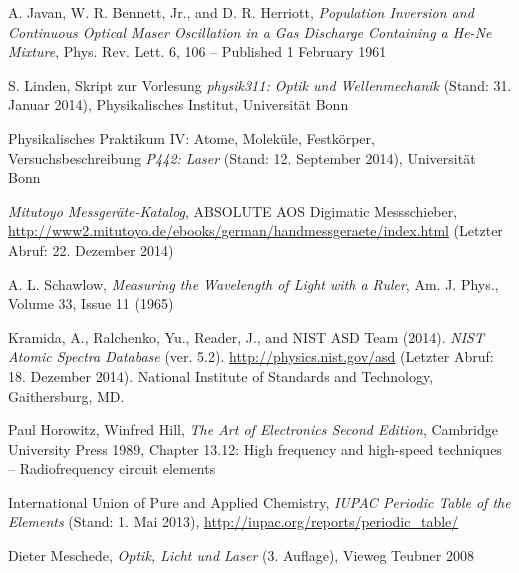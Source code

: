 \documentclass[11pt, a4paper]{article}
\numberwithin{equation}{section}
\begin{document}
\begin{thebibliography}{9}
	A. Javan, W. R. Bennett, Jr., and D. R. Herriott,
	\emph{Population Inversion and Continuous Optical Maser Oscillation in a Gas Discharge Containing a He-Ne Mixture},
	Phys. Rev. Lett. 6, 106 – Published 1 February 1961

	S. Linden,
	Skript zur Vorlesung \emph{physik311: Optik und Wellenmechanik} (Stand: 31. Januar 2014),
	Physikalisches Institut, Universität Bonn

	Physikalisches Praktikum IV: Atome, Moleküle, Festkörper,
	Versuchsbeschreibung \emph{P442: Laser} (Stand: 12. September 2014),
	Universität Bonn
	
	\emph{Mitutoyo Messgeräte-Katalog},
	ABSOLUTE AOS Digimatic Messschieber,\\
	\url{http://www2.mitutoyo.de/ebooks/german/handmessgeraete/index.html} (Letzter Abruf: 22. Dezember 2014)	

	A. L. Schawlow,
	\emph{Measuring the Wavelength of Light with a Ruler},
	Am. J. Phys., Volume 33, Issue 11 (1965)

	Kramida, A., Ralchenko, Yu., Reader, J., and NIST ASD Team (2014).
	\emph{NIST Atomic Spectra Database} (ver. 5.2).
	\url{http://physics.nist.gov/asd} (Letzter Abruf: 18. Dezember 2014).
	National Institute of Standards and Technology, Gaithersburg, MD.
	
	Paul Horowitz, Winfred Hill,
	\emph{The Art of Electronics Second Edition},
	Cambridge University Press 1989,
	Chapter 13.12: High frequency and high-speed techniques -- Radiofrequency circuit elements

	International Union of Pure and Applied Chemistry,
	\emph{IUPAC Periodic Table of the Elements} (Stand: 1. Mai 2013),
	\url{http://iupac.org/reports/periodic_table/}

	Dieter Meschede,
	\emph{Optik, Licht und Laser} (3. Auflage),
	Vieweg Teubner 2008
	
	
 
\end{thebibliography}

\clearpage
\end{document}
